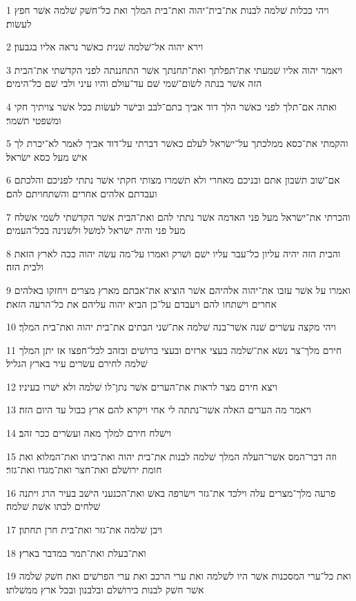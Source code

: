 \par 1 ויהי ככלות שׁלמה לבנות את־בית־יהוה ואת־בית המלך ואת כל־חשׁק שׁלמה אשׁר חפץ לעשׂות׃
\par 2 וירא יהוה אל־שׁלמה שׁנית כאשׁר נראה אליו בגבעון׃
\par 3 ויאמר יהוה אליו שׁמעתי את־תפלתך ואת־תחנתך אשׁר התחננתה לפני הקדשׁתי את־הבית הזה אשׁר בנתה לשׂום־שׁמי שׁם עד־עולם והיו עיני ולבי שׁם כל־הימים׃
\par 4 ואתה אם־תלך לפני כאשׁר הלך דוד אביך בתם־לבב ובישׁר לעשׂות ככל אשׁר צויתיך חקי ומשׁפטי תשׁמר׃
\par 5 והקמתי את־כסא ממלכתך על־ישׂראל לעלם כאשׁר דברתי על־דוד אביך לאמר לא־יכרת לך אישׁ מעל כסא ישׂראל׃
\par 6 אם־שׁוב תשׁבון אתם ובניכם מאחרי ולא תשׁמרו מצותי חקתי אשׁר נתתי לפניכם והלכתם ועבדתם אלהים אחרים והשׁתחויתם להם׃
\par 7 והכרתי את־ישׂראל מעל פני האדמה אשׁר נתתי להם ואת־הבית אשׁר הקדשׁתי לשׁמי אשׁלח מעל פני והיה ישׂראל למשׁל ולשׁנינה בכל־העמים׃
\par 8 והבית הזה יהיה עליון כל־עבר עליו ישׁם ושׁרק ואמרו על־מה עשׂה יהוה ככה לארץ הזאת ולבית הזה׃
\par 9 ואמרו על אשׁר עזבו את־יהוה אלהיהם אשׁר הוציא את־אבתם מארץ מצרים ויחזקו באלהים אחרים וישׁתחו להם ויעבדם על־כן הביא יהוה עליהם את כל־הרעה הזאת׃
\par 10 ויהי מקצה עשׂרים שׁנה אשׁר־בנה שׁלמה את־שׁני הבתים את־בית יהוה ואת־בית המלך׃
\par 11 חירם מלך־צר נשׂא את־שׁלמה בעצי ארזים ובעצי ברושׁים ובזהב לכל־חפצו אז יתן המלך שׁלמה לחירם עשׂרים עיר בארץ הגליל׃
\par 12 ויצא חירם מצר לראות את־הערים אשׁר נתן־לו שׁלמה ולא ישׁרו בעיניו׃
\par 13 ויאמר מה הערים האלה אשׁר־נתתה לי אחי ויקרא להם ארץ כבול עד היום הזה׃
\par 14 וישׁלח חירם למלך מאה ועשׂרים ככר זהב׃
\par 15 וזה דבר־המס אשׁר־העלה המלך שׁלמה לבנות את־בית יהוה ואת־ביתו ואת־המלוא ואת חומת ירושׁלם ואת־חצר ואת־מגדו ואת־גזר׃
\par 16 פרעה מלך־מצרים עלה וילכד את־גזר וישׂרפה באשׁ ואת־הכנעני הישׁב בעיר הרג ויתנה שׁלחים לבתו אשׁת שׁלמה׃
\par 17 ויבן שׁלמה את־גזר ואת־בית חרן תחתון׃
\par 18 ואת־בעלת ואת־תמר במדבר בארץ׃
\par 19 ואת כל־ערי המסכנות אשׁר היו לשׁלמה ואת ערי הרכב ואת ערי הפרשׁים ואת חשׁק שׁלמה אשׁר חשׁק לבנות בירושׁלם ובלבנון ובכל ארץ ממשׁלתו׃

